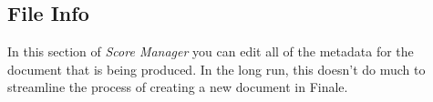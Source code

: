 \documentclass[]{memoir}
\begin{document}
\subsection{File Info}
\label{sec:file-info}

In this section of \textit{Score Manager} you can edit all of the metadata for the document that is being produced. In the long run, this doesn't do much to streamline the process of creating a new document in Finale.


\end{document}
